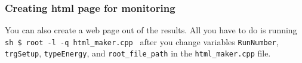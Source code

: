 \subsubsection{Creating html page for monitoring}\hypertarget{creating-html-page-for-monitoring}{}\label{creating-html-page-for-monitoring}

You can also create a web page out of the results. All you have to do is running
\texttt{sh
\$ root -l -q html\_maker.cpp
}
after you change variables \texttt{RunNumber}, \texttt{trgSetup}, \texttt{typeEnergy}, and \texttt{root\_file\_path} in the \texttt{html\_maker.cpp} file.

